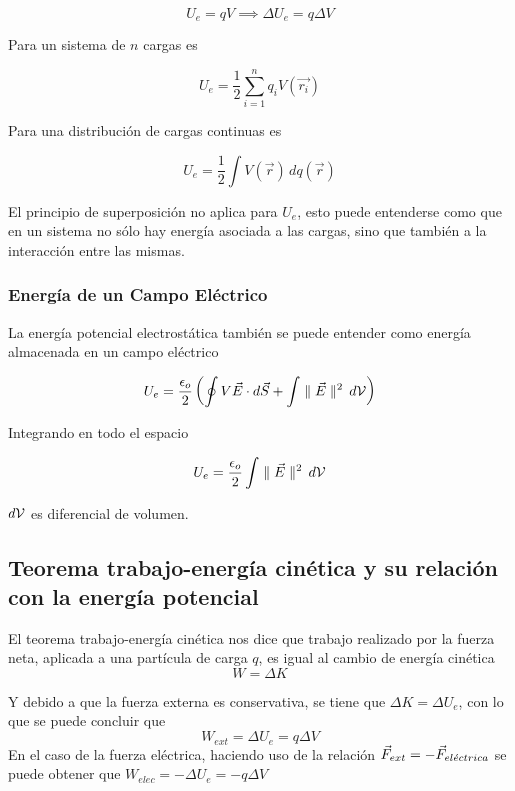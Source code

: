 \[U_e = qV \implies \Delta U_e = q \Delta V\]

Para un sistema de $n$ cargas es

\[U_e = \frac{1}{2}\sum_{i=1}^nq_iV(\Vec{r_i})\]

Para una distribución de cargas continuas es

\[U_e = \frac{1}{2}\int V(\Vec{r})\, dq(\Vec{r})\]

El principio de superposición no aplica para $U_e$, esto puede entenderse como que en un sistema no sólo hay energía asociada a las cargas, sino que también a la interacción entre las mismas.

\subsubsection{Energía de un Campo Eléctrico}

La energía potencial electrostática también se puede entender como energía almacenada en un campo eléctrico

\[U_e = \frac{\epsilon_o}{2}\left(
\oint V\Vec{E}\cdot d\Vec{S}
+\int \parallel\Vec{E}\parallel^2\, d\mathcal{V}
\right)\]

Integrando en todo el espacio

\[U_e = \frac{\epsilon_o}{2}\int \parallel\Vec{E}\parallel^2\, d\mathcal{V}\]

$d\mathcal{V}$ es diferencial de volumen.

\subsection{Teorema trabajo-energía cinética y su relación con la energía potencial}

El teorema trabajo-energía cinética nos dice que trabajo realizado por la fuerza neta, aplicada a una partícula de carga $q$, es igual al cambio de energía cinética
\[W = \Delta K\]

Y debido a que la fuerza externa es conservativa, se tiene que $\Delta K = \Delta U_e$, con lo que se puede concluir que
\[W_{ext} = \Delta U_e = q \Delta V\]
En el caso de la fuerza eléctrica, haciendo uso de la relación $\Vec{F}_{ext} = -\Vec{F}_{el\Acute{e}ctrica}$ se puede obtener que $ W_{elec} = -\Delta U_e =-q\Delta V$

\newpage